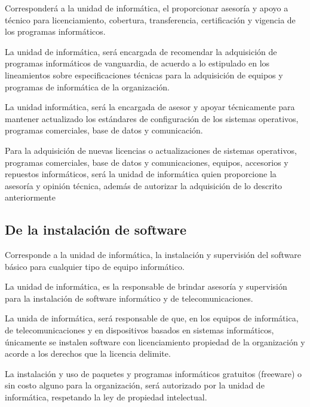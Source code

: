 \documentclass{book}
\begin{document}
                Corresponderá a la unidad de informática, el proporcionar asesoría y apoyo a
                técnico para licenciamiento, cobertura, transferencia, certificación y vigencia de los
                programas informáticos.

                La unidad de informática, será encargada de recomendar la adquisición de
                programas informáticos de vanguardia, de acuerdo a lo estipulado en los lineamientos
                sobre especificaciones técnicas para la adquisición de equipos y programas de
                informática de la organización.

                La unidad informática, será la encargada de asesor y apoyar técnicamente para
                mantener actualizado los estándares de configuración de los sistemas operativos,
                programas comerciales, base de datos y comunicación.

                Para la adquisición de nuevas licencias o actualizaciones de sistemas operativos,
                programas comerciales, base de datos y comunicaciones, equipos, accesorios y
                repuestos informáticos, será la unidad de informática quien proporcione la asesoría y
                opinión técnica, además de autorizar la adquisición de lo descrito anteriormente
            \

            \subsection{De la instalación de software}
                Corresponde a la unidad de informática, la instalación y supervisión del software
                básico para cualquier tipo de equipo informático.

                La unidad de informática, es la responsable de brindar asesoría y supervisión
                para la instalación de software informático y de telecomunicaciones.

                La unida de informática, será responsable de que, en los equipos de informática,
                de telecomunicaciones y en dispositivos basados en sistemas informáticos, únicamente
                se instalen software con licenciamiento propiedad de la organización y acorde a los
                derechos que la licencia delimite.

                La instalación y uso de paquetes y programas informáticos gratuitos (freeware) o
                sin costo alguno para la organización, será autorizado por la unidad de informática,
                respetando la ley de propiedad intelectual.
\end{document}
